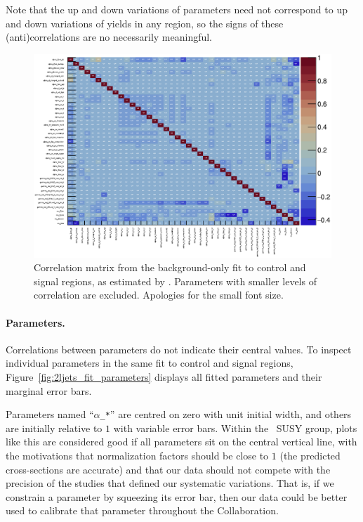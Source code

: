 Note that the up and down variations of parameters need not correspond to up
and down variations of yields in any region, so the signs of these
(anti)correlations are no necessarily meaningful.

\begin{figure}[tp]
\centering
\includegraphics[height=\textwidth,angle=90,origin=c]{figures/2ljets_fit_corrmatrix.pdf}
\caption[
Correlation matrix from the background-only fit to control and signal regions
]{%
Correlation matrix from the background-only fit to control and signal regions,
as estimated by \histfitter.
Parameters with smaller levels of correlation are excluded.
Apologies for the small font size.
}
\label{fig:2ljets_fit_corrmatrix}
\end{figure}

\paragraph{Parameters.}
Correlations between parameters do not indicate their central values.
To inspect individual parameters in the same fit to control and signal regions,
Figure~\ref{fig:2ljets_fit_parameters} displays all fitted parameters and their
marginal error bars.

Parameters named ``\texttt{$\alpha$\_*}'' are centred on zero with unit initial
width, and others are initially relative to $1$ with variable error bars.
Within the \atlas\ SUSY group, plots like this are considered good if all
parameters sit on the central vertical line, with the motivations that
normalization factors should be close to $1$ (the predicted cross-sections are
accurate) and that our data should not compete with the precision of the
studies that defined our systematic variations.
That is, if we constrain a parameter by squeezing its error bar, then our data
could be better used to calibrate that parameter throughout the Collaboration.

